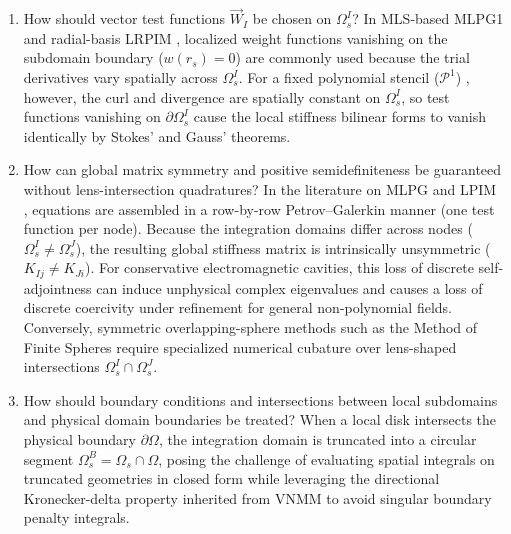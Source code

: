 \documentclass[VANCOUVER,Times1COL]{WileyNJD-v5}
\begin{document}
\begin{enumerate}
    \item How should vector test functions $\vec{W}_I$ be chosen on $\Omega_s^I$? In MLS-based MLPG1 \cite{atluri1998new, atluri2002meshless} and radial-basis LRPIM \cite{liu2005introduction}, localized weight functions vanishing on the subdomain boundary ($w(r_s) = 0$) are commonly used because the trial derivatives vary spatially across $\Omega_s^I$. For a fixed polynomial stencil ($\mathcal{P}^1$) \cite{liu2001local, stable_vnmm2d_2026}, however, the curl and divergence are spatially constant on $\Omega_s^I$, so test functions vanishing on $\partial\Omega_s^I$ cause the local stiffness bilinear forms to vanish identically by Stokes' and Gauss' theorems.
    \item How can global matrix symmetry and positive semidefiniteness be guaranteed without lens-intersection quadratures? In the literature on MLPG \cite{atluri2002meshless, nicomedes2012meshless} and LPIM \cite{liu2001local, liu2005introduction}, equations are assembled in a row-by-row Petrov--Galerkin manner (one test function per node). Because the integration domains differ across nodes ($\Omega_s^I \ne \Omega_s^J$), the resulting global stiffness matrix is intrinsically unsymmetric ($K_{Ij} \ne K_{Ji}$). For conservative electromagnetic cavities, this loss of discrete self-adjointness can induce unphysical complex eigenvalues \cite{saad2011numerical, boffi2013mixed} and causes a loss of discrete coercivity under refinement for general non-polynomial fields. Conversely, symmetric overlapping-sphere methods such as the Method of Finite Spheres \cite{de2000method, nicomedes2021acoustic} require specialized numerical cubature over lens-shaped intersections $\Omega_s^I \cap \Omega_s^J$.
    \item How should boundary conditions and intersections between local subdomains and physical domain boundaries be treated? When a local disk intersects the physical boundary $\partial\Omega$, the integration domain is truncated into a circular segment $\Omega_s^B = \Omega_s \cap \Omega$, posing the challenge of evaluating spatial integrals on truncated geometries in closed form while leveraging the directional Kronecker-delta property inherited from VNMM \cite{ortiz2021nodal, goncalves2023vector, stable_vnmm2d_2026} to avoid singular boundary penalty integrals.

\end{enumerate}
\end{document}
